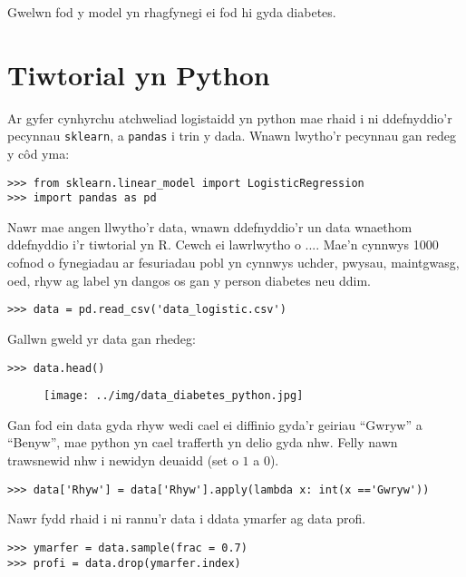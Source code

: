 Gwelwn fod y model yn rhagfynegi ei fod hi gyda diabetes.

\section{Tiwtorial yn Python}

Ar gyfer cynhyrchu atchweliad logistaidd yn python mae rhaid i ni ddefnyddio'r pecynnau \texttt{sklearn}, a \texttt{pandas} i trin y dada. Wnawn lwytho'r pecynnau gan redeg y c\^{o}d yma:

\begin{verbatim}
>>> from sklearn.linear_model import LogisticRegression
>>> import pandas as pd
\end{verbatim}

Nawr mae angen llwytho'r data, wnawn ddefnyddio'r un data wnaethom ddefnyddio i'r tiwtorial yn R. Cewch ei lawrlwytho o .... Mae'n cynnwys 1000 cofnod o fynegiadau ar fesuriadau pobl yn cynnwys uchder, pwysau, maintgwasg, oed, rhyw ag label yn dangos os gan y person diabetes neu ddim.  

\begin{verbatim}
>>> data = pd.read_csv('data_logistic.csv')
\end{verbatim}

Gallwn gweld yr data gan rhedeg:

\begin{verbatim}
>>> data.head()
\end{verbatim}

\begin{figure}[H]
\begin{center}
\texttt{[image: ../img/data\_diabetes\_python.jpg]}
\end{center}
\end{figure}

Gan fod ein data gyda rhyw wedi cael ei diffinio gyda'r geiriau ``Gwryw'' a ``Benyw'', mae python yn cael trafferth yn delio gyda nhw. Felly nawn trawsnewid nhw i newidyn deuaidd (set o $1$ a $0$).

\begin{verbatim}
>>> data['Rhyw'] = data['Rhyw'].apply(lambda x: int(x =='Gwryw'))
\end{verbatim}

Nawr fydd rhaid i ni rannu'r data i ddata ymarfer ag data profi.

\begin{verbatim}
>>> ymarfer = data.sample(frac = 0.7)
>>> profi = data.drop(ymarfer.index)
\end{verbatim}

